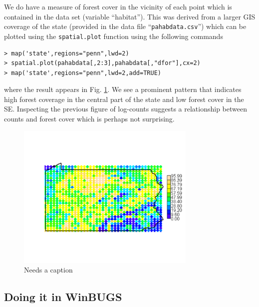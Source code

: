 We do have a measure of forest cover in the vicinity of each point
which is contained in the data set (variable ``habitat''). This was derived
from a larger GIS coverage of the state (provided in the data file
``\mbox{\tt pahabdata.csv}'') which can be plotted using the \mbox{\tt spatial.plot} function
using the following commands
{\small
\begin{verbatim}
> map('state',regions="penn",lwd=2)
> spatial.plot(pahabdata[,2:3],pahabdata[,"dfor"],cx=2)
> map('state',regions="penn",lwd=2,add=TRUE)
\end{verbatim}
}
where the result appears in Fig. \ref{glms.fig.paforest}.
We see a prominent pattern that indicates high forest coverage in the
central part of the state and low forest cover in the SE.  Inspecting
the previous figure of log-counts suggests a relationship between
counts and forest cover which is perhaps not surprising.
\begin{figure}
\begin{center}
\includegraphics[height=2.75in]{Ch2/figs/PA2}
\end{center}
\caption{Needs a caption}
\label{glms.fig.paforest}
\end{figure}

\subsection{Doing it in WinBUGS}

